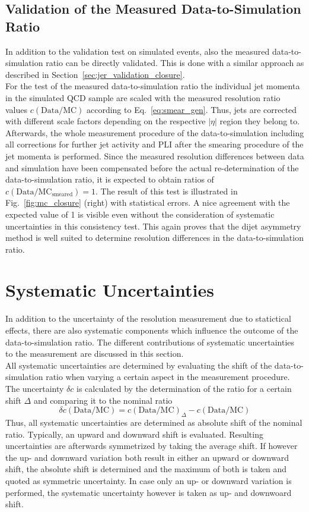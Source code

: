 \subsection{Validation of the Measured Data-to-Simulation Ratio}
\label{sec:jer_validation_ratio}
In addition to the validation test on simulated events, also the measured data-to-simulation ratio can be directly validated. This is done with a similar approach as described in Section~\ref{sec:jer_validation_closure}.\\
For the test of the measured data-to-simulation ratio the individual jet momenta in the simulated \pythia QCD sample are scaled with the measured resolution ratio values $c{(\mathrm{Data}/\mathrm{MC})}$ according to Eq.~\ref{eq:smear_gen}. Thus, jets are corrected with different scale factors depending on the respective $|\eta|$ region they belong to. Afterwards, the whole measurement procedure of the data-to-simulation including all corrections for further jet activity and PLI after the smearing procedure of the jet momenta is performed. Since the measured resolution differences between data and simulation have been compensated before the actual re-determination of the data-to-simulation ratio, it is expected to obtain ratios of $c\mathrm{(Data/MC_{smeared})} = 1$. The result of this test is illustrated in Fig.~\ref{fig:mc_closure} (right) with statistical errors. A nice agreement with the expected value of 1 is visible even without the consideration of systematic uncertainties in this consistency test. This again proves that the dijet asymmetry method is well suited to determine resolution differences in the data-to-simulation ratio. 

\section{Systematic Uncertainties}
\label{sec:jer_syst_unc}
In addition to the uncertainty of the resolution measurement due to statictical effects, there are also systematic components which influence the outcome of the data-to-simulation ratio. The different contributions of systematic uncertainties to the measurement are discussed in this section.\\
All systematic uncertainties are determined by evaluating the shift of the data-to-simulation ratio when varying a certain aspect in the measurement procedure. The uncertainty $\delta c$ is calculated by the determination of the ratio for a certain shift $\Delta$ and comparing it to the nominal ratio 
 \begin{equation}
  \delta c{\mathrm{(Data/MC)}} = c{\mathrm{(Data/MC)}_{\Delta}} - c\mathrm{(Data/MC)}
 \end{equation} 
Thus, all systematic uncertainties are determined as absolute shift of the nominal ratio. Typically, an upward and downward shift is evaluated. Resulting uncertainties are afterwards symmetrized by taking the average shift. If however the up- and downward variation both result in either an upward or downward shift, the absolute shift is determined and the maximum of both is taken and quoted as symmetric uncertainty. In case only an up- or downward variation is performed, the systematic uncertainty however is taken as up- and downwoard shift.   

